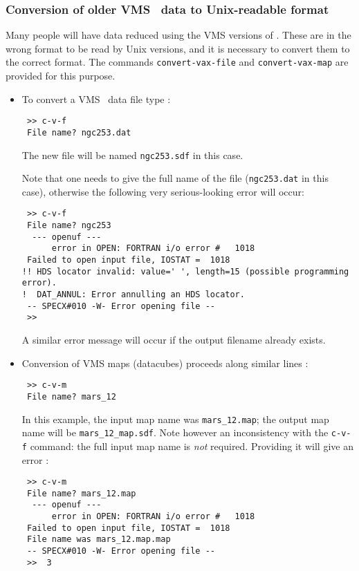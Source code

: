 \subsubsection{Conversion of older VMS \SPECX\ data to Unix-readable
format}
\label{sec:cvf_cvm}
Many people will have data reduced using the VMS versions of
\SPECX . These are in the wrong format to be read by Unix versions,
and it is necessary to convert them to the correct format. The
commands {\tt convert-vax-file} and {\tt convert-vax-map} are provided
for this purpose.
\begin{itemize}
\item
To convert a VMS \SPECX\ data file type \eg :
\begin{verbatim}
 >> c-v-f
 File name? ngc253.dat
\end{verbatim}
The new file will be named {\tt ngc253.sdf} in this case.

Note that one needs to give the full name of the file ({\tt{ngc253.dat}}
in this case), otherwise the following very serious-looking error will
occur:

\begin{verbatim}
 >> c-v-f
 File name? ngc253
  --- openuf ---
      error in OPEN: FORTRAN i/o error #   1018
 Failed to open input file, IOSTAT =  1018
!! HDS locator invalid: value=' ', length=15 (possible programming error).
!  DAT_ANNUL: Error annulling an HDS locator.
 -- SPECX#010 -W- Error opening file --
 >> 
\end{verbatim}
A similar error message will occur if the output filename already exists.
\item
Conversion of VMS maps (datacubes) proceeds along similar lines \eg :
\begin{verbatim}
 >> c-v-m
 File name? mars_12
\end{verbatim}

In this example, the input map name was {\tt mars\_12.map}; the output
map name will be {\tt mars\_12\_map.sdf}. Note however an inconsistency
with the {\tt c-v-f} command: the full input map name is {\it not}
required. Providing it will give an error \eg :

\begin{verbatim}
 >> c-v-m
 File name? mars_12.map
  --- openuf ---
      error in OPEN: FORTRAN i/o error #   1018
 Failed to open input file, IOSTAT =  1018
 File name was mars_12.map.map
 -- SPECX#010 -W- Error opening file --
 >>  3 
\end{verbatim}
\end{itemize}

